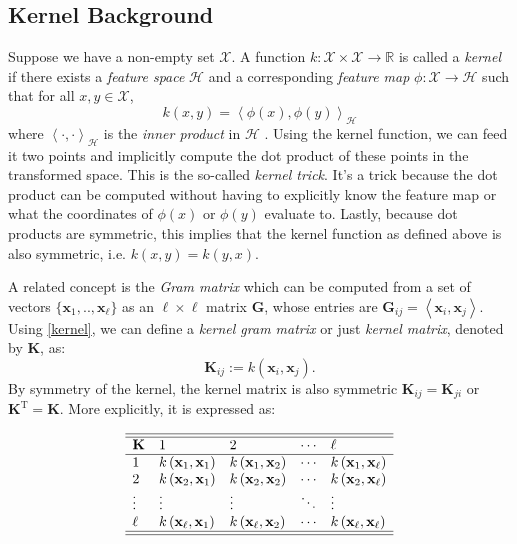 \subsection{Kernel Background}

Suppose we have a non-empty set  $\mathcal{X}$. A function $k: \mathcal{X} \times \mathcal{X} \rightarrow \mathbb{R}$ is called a \textit{kernel} if there exists a \textit{feature space} $ \mathcal{H}$ and a corresponding \textit{feature map} $\phi: \mathcal{X} \rightarrow \mathcal{H}$ such that for all $x,y \in \mathcal{X}$,  %
\begin{equation}
\label{kernel}
k(x,y) = \left\langle \phi(x), \phi(y) \right\rangle_\mathcal{H}
\end{equation}
where $\left\langle \cdot, \cdot \right\rangle_\mathcal{H}$ is the \textit{inner product} in $ \mathcal{H}$  \cite{scholkopf2002learning}. Using the kernel function, we can feed it two points and implicitly compute the dot product of these points in the transformed space. This is the so-called \textit{kernel trick}. It's a trick because the dot product can be computed without having to explicitly know the feature map or what the coordinates of $\phi(x)$ or $\phi(y)$ evaluate to. Lastly, because dot products are symmetric, this implies that the kernel function as defined above is also symmetric, i.e. $k(x, y) = k(y, x)$.

A related concept is the \textit{Gram matrix} which can be computed from a set of vectors $\{\mathbf{x}_1,..,\mathbf{x}_{\ell}\}$ as an $\ell \times \ell$ matrix $\mathbf{G}$, whose entries are $\mathbf{G}_{ij} = \left\langle \mathbf{x}_i, \mathbf{x}_j \right\rangle$. Using \ref{kernel}, we can define a \textit{kernel gram matrix} or just \textit{kernel matrix}, denoted by $\mathbf{K}$, as:
\begin{equation}
\mathbf{K}_{ij} := k(\mathbf{x}_i, \mathbf{x}_j ).
\end{equation}
By symmetry of the kernel, the kernel matrix is also symmetric $\mathbf{K}_{ij}=\mathbf{K}_{ji}$ or $\mathbf{K}^\text{T} = \mathbf{K}$. More explicitly, it is expressed as:

\begin{equation}
\begin{array}{lllll}
\hline \hline \mathbf{K} & 1 & 2 & \cdots & \ell \\
\hline 1 & k \left(\mathbf{x}_{1}, \mathbf{x}_{1}\right) & k\left(\mathbf{x}_{1}, \mathbf{x}_{2}\right) & \cdots & k
\left(\mathbf{x}_{1}, \mathbf{x}_{\ell}\right) \\
2 & k\left(\mathbf{x}_{2}, \mathbf{x}_{1}\right) & k\left(\mathbf{x}_{2}, \mathbf{x}_{2}\right) & \cdots & k\left(\mathbf{x}_{2}, \mathbf{x}_{\ell}\right) \\
\vdots & \vdots & \vdots & \ddots & \vdots \\
\ell & k\left(\mathbf{x}_{\ell}, \mathbf{x}_{1}\right) & k\left(\mathbf{x}_{\ell}, \mathbf{x}_{2}\right) & \cdots & k \left(\mathbf{x}_{\ell}, \mathbf{x}_{\ell}\right) \\
\hline \hline
\end{array}
\end{equation}

